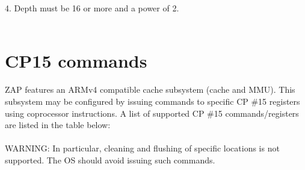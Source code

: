 \documentclass[10pt]{article}
\begin{document}
4. Depth must be 16 or more and a power of 2. \\
\\

\section{CP15 commands}

ZAP features an ARMv4 compatible cache subsystem (cache and MMU). This subsystem 
may be configured by issuing commands to specific CP \#15 registers using 
coprocessor instructions. A list of supported CP \#15 commands/registers are 
listed in the table below:
\\
\\
WARNING: In particular, cleaning and flushing of specific locations is not 
supported. The OS should avoid issuing such commands.
\\
\\
\end{document}
